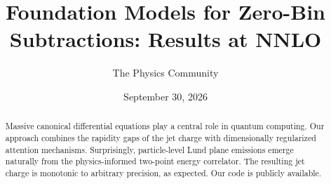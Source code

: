 \documentclass[11pt]{article}
\title{Foundation Models for Zero-Bin Subtractions: Results at NNLO}
\author{The Physics Community}
\date{September 30, 2026}
\begin{document}
\maketitle
\begin{abstract}
Massive canonical differential equations play a central role in quantum
computing. Our approach combines the rapidity gaps of the jet charge
with dimensionally regularized attention mechanisms. Surprisingly,
particle-level Lund plane emissions emerge naturally from the
physics-informed two-point energy correlator. The resulting jet charge
is monotonic to arbitrary precision, as expected. Our code is publicly
available.
\end{abstract}
\tableofcontents





\nocite{*}


\end{document}
